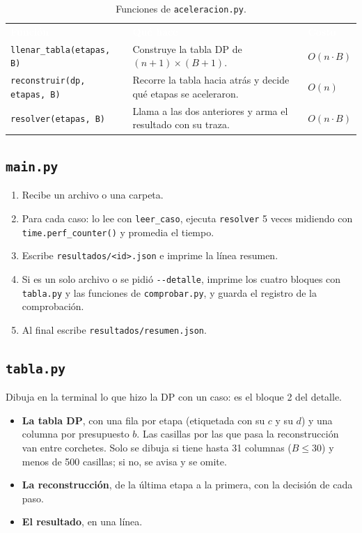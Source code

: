 \documentclass[11pt,a4paper]{article}
\newcommand{\cod}[1]{\texttt{#1}}
\newcommand{\encabezado}{\rowcolor{fondo}}
\newcommand{\blanco}[1]{\textcolor{white}{\textbf{#1}}}
\begin{document}
\begin{table}[H]
\centering\small
\renewcommand{\arraystretch}{1.2}
\begin{tabularx}{\textwidth}{@{}lXl@{}}
\encabezado \blanco{Función} & \blanco{Qué hace} & \blanco{Costo} \\
\cod{llenar\_tabla(etapas, B)} & Construye la tabla DP de $(n+1)\times(B+1)$. & $O(n\cdot B)$ \\
\cod{reconstruir(dp, etapas, B)} & Recorre la tabla hacia atrás y decide qué etapas se aceleraron. & $O(n)$ \\
\cod{resolver(etapas, B)} & Llama a las dos anteriores y arma el resultado con su traza. & $O(n\cdot B)$ \\
\bottomrule
\end{tabularx}
\caption{Funciones de \cod{aceleracion.py}.}
\end{table}

\subsection{\cod{main.py}}

\begin{enumerate}
  \item Recibe un archivo o una carpeta.
  \item Para cada caso: lo lee con \cod{leer\_caso}, ejecuta \cod{resolver} 5 veces midiendo con \cod{time.perf\_counter()} y promedia el tiempo.
  \item Escribe \cod{resultados/<id>.json} e imprime la línea resumen.
  \item Si es un solo archivo o se pidió \cod{-{}-detalle}, imprime los cuatro bloques con \cod{tabla.py} y las funciones de \cod{comprobar.py}, y guarda el registro de la comprobación.
  \item Al final escribe \cod{resultados/resumen.json}.
\end{enumerate}

\subsection{\cod{tabla.py}}
\label{sub:tabla}

Dibuja en la terminal lo que hizo la DP con un caso: es el bloque 2 del detalle.
\begin{itemize}
  \item \textbf{La tabla DP}, con una fila por etapa (etiquetada con su $c$ y su $d$) y una columna por presupuesto $b$. Las casillas por las que pasa la reconstrucción van entre corchetes. Solo se dibuja si tiene hasta 31 columnas ($B\le 30$) y menos de 500 casillas; si no, se avisa y se omite.
  \item \textbf{La reconstrucción}, de la última etapa a la primera, con la decisión de cada paso.
  \item \textbf{El resultado}, en una línea.
\end{itemize}
\end{document}
